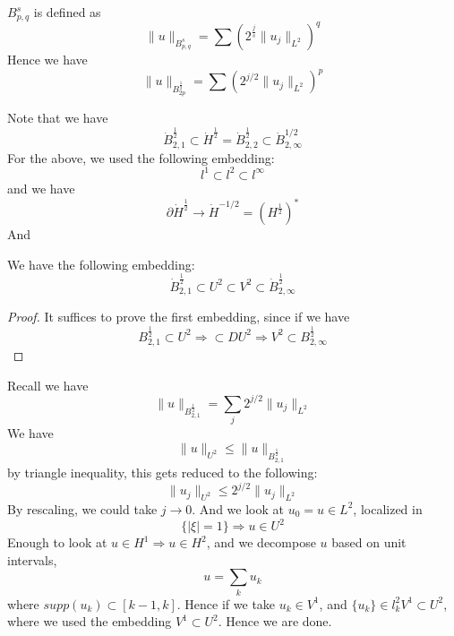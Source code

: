 \begin{definition}
    $B_{p,q}^s$ is defined as 
    \begin{equation*}
        \|u\|_{B_{p,q}^s}=\sum\left( 2^\frac{j}{s}\|u_j\|_{L^2}\right)^q
    \end{equation*}
    Hence we have
    \begin{equation*}
        \|u\|_{B_{2p}^\frac{1}{2}}=\sum\left( 2^{j/2}\|u_j\|_{L^2}\right)^p
    \end{equation*}
\end{definition}
Note that we have
\begin{equation*}
    \dot{B}_{2,1}^\frac{1}{2}\subset \dot{H}^\frac{1}{2}=\dot{B}_{2,2}^\frac{1}{2}\subset\dot{B}_{2,\infty}^{1/2}
\end{equation*}
For the above, we used the following embedding:
\begin{equation*}
    l^1\subset l^2\subset l^\infty
\end{equation*}
and we have
\begin{equation*}
    \partial\dot{H}^\frac{1}{2}\to\dot{H}^{-1/2}=(H^\frac{1}{2})^*
\end{equation*}
And 


\begin{proposition}
    We have the following embedding:
    \begin{equation*}
        \dot{B}_{2,1}^\frac{1}{2}\subset U^2\subset V^2\subset \dot{B}_{2,\infty}^\frac{1}{2}
    \end{equation*}
\end{proposition}
\begin{proof}
    It suffices to prove the first embedding, since if we have
    \begin{equation*}
        B_{2,1}^\frac{1}{2}\subset U^2\Rightarrow \subset DU^2\Rightarrow V^2\subset B_{2,\infty}^\frac{1}{2}
    \end{equation*}
\end{proof}
Recall we have
\begin{equation*}
    \|u\|_{B_{2,1}^\frac{1}{2}}=\sum_j2^{j/2}\|u_j\|_{L^2}
\end{equation*}
We have
\begin{equation*}
    \|u\|_{U^2}\leq\|u\|_{B_{2,1}^\frac{1}{2}}
\end{equation*}
by triangle inequality, this gets reduced to the following:
\begin{equation*}
    \|u_j\|_{U^2}\leq 2^{j/2}\|u_j\|_{L^2}
\end{equation*}
By rescaling, we could take $j\to 0$. And we look at $u_0=u\in L^2$, localized in 
\begin{equation*}
    \{|\xi|=1\}\Rightarrow u\in U^2
\end{equation*}
Enough to look at $u\in H^1\Rightarrow u\in H^2$, and we decompose $u$ based on unit intervals,
\begin{equation*}
    u=\sum_k u_k
\end{equation*}
where $supp(u_k)\subset [k-1, k]$. Hence if we take $u_k\in V^1$, and $\{u_k\}\in l_k^2V^1\subset U^2$, where we used the embedding $V^1\subset U^2$. Hence we are done.

